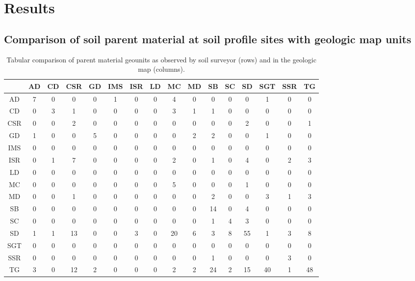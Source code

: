 \documentclass[preprint,12pt,authoryear]{elsarticle}
\begin{document}
\section{Results}
\subsection{Comparison of soil parent material at soil profile sites with geologic map units}
\begin{table}[ht]
\centering
\tabcolsep=0.10cm
\begin{tabular}{cccccccccccccccc}
  \hline
 & AD & CD & CSR & GD & IMS & ISR & LD & MC & MD & SB & SC & SD & SGT & SSR & TG \\ 
  \hline
AD &   7 &   0 &   0 &   0 &   1 &   0 &   0 &   4 &   0 &   0 &   0 &   0 &   1 &   0 &   0 \\ 
  CD &   0 &   3 &   1 &   0 &   0 &   0 &   0 &   3 &   1 &   1 &   0 &   0 &   0 &   0 &   0 \\ 
  CSR &   0 &   0 &   2 &   0 &   0 &   0 &   0 &   0 &   0 &   0 &   0 &   2 &   0 &   0 &   1 \\ 
  GD &   1 &   0 &   0 &   5 &   0 &   0 &   0 &   0 &   2 &   2 &   0 &   0 &   1 &   0 &   0 \\ 
  IMS &   0 &   0 &   0 &   0 &   0 &   0 &   0 &   0 &   0 &   0 &   0 &   0 &   0 &   0 &   0 \\ 
  ISR &   0 &   1 &   7 &   0 &   0 &   0 &   0 &   2 &   0 &   1 &   0 &   4 &   0 &   2 &   3 \\ 
  LD &   0 &   0 &   0 &   0 &   0 &   0 &   0 &   0 &   0 &   0 &   0 &   0 &   0 &   0 &   0 \\ 
  MC &   0 &   0 &   0 &   0 &   0 &   0 &   0 &   5 &   0 &   0 &   0 &   1 &   0 &   0 &   0 \\ 
  MD &   0 &   0 &   1 &   0 &   0 &   0 &   0 &   0 &   0 &   2 &   0 &   0 &   3 &   1 &   3 \\ 
  SB &   0 &   0 &   0 &   0 &   0 &   0 &   0 &   0 &   0 &  14 &   0 &   4 &   0 &   0 &   0 \\ 
  SC &   0 &   0 &   0 &   0 &   0 &   0 &   0 &   0 &   0 &   1 &   4 &   3 &   0 &   0 &   0 \\ 
  SD &   1 &   1 &  13 &   0 &   0 &   3 &   0 &  20 &   6 &   3 &   8 &  55 &   1 &   3 &   8 \\ 
  SGT &   0 &   0 &   0 &   0 &   0 &   0 &   0 &   0 &   0 &   0 &   0 &   0 &   0 &   0 &   0 \\ 
  SSR &   0 &   0 &   0 &   0 &   0 &   0 &   0 &   0 &   0 &   1 &   0 &   0 &   0 &   3 &   0 \\ 
  TG &   3 &   0 &  12 &   2 &   0 &   0 &   0 &   2 &   2 &  24 &   2 &  15 &  40 &   1 &  48 \\ 
   \hline
\end{tabular}
\caption{Tabular comparison of parent material geounits as observed by soil surveyor (rows) and in the geologic map (columns).} 
\label{kartiergegenkarte}
\end{table}
\end{document}
